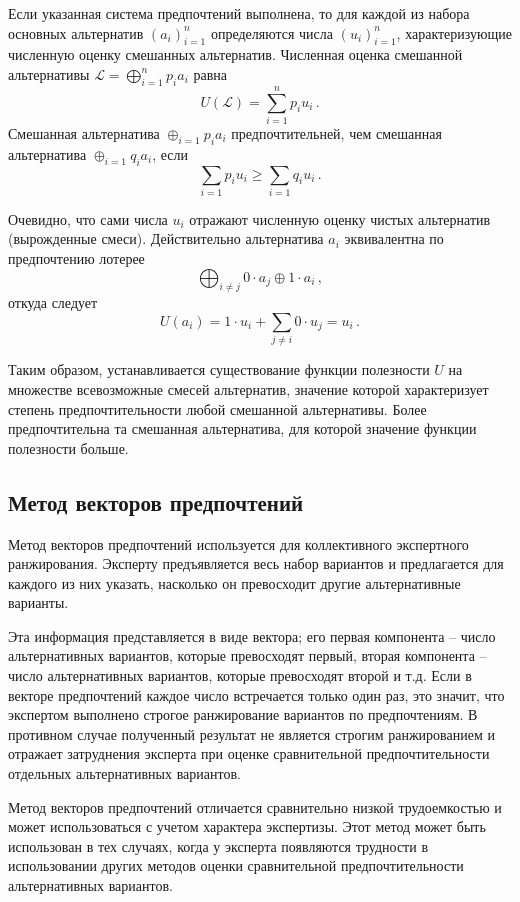 \documentclass[a4paper,12pt]{extreport}
\newcommand{\Lcal}{\mathcal{L}}
\begin{document}
Если указанная система предпочтений выполнена, то для каждой из набора основных
альтернатив $(a_i)_{i=1}^n$ определяются числа $(u_i)_{i=1}^n$, характеризующие
численную оценку смешанных альтернатив. Численная оценка смешанной альтернативы
$\Lcal = \bigoplus_{i=1}^n p_i a_i$ равна
\[ U(\Lcal) = \sum_{i=1}^n p_i u_i\,. \]
Смешанная альтернатива $\oplus_{i=1}p_i a_i$ предпочтительней, чем смешанная альтернатива
$\oplus_{i=1}q_i a_i$, если 
\[ \sum_{i=1} p_i u_i \geq \sum_{i=1} q_i u_i\,. \]

Очевидно, что сами числа $u_i$ отражают численную оценку чистых альтернатив
(вырожденные смеси). Действительно альтернатива $a_i$ эквивалентна по предпочтению
лотерее
\[ \bigoplus_{i\neq j} 0\cdot a_j \oplus 1\cdot a_i\,, \]
откуда следует
\[ U(a_i) = 1 \cdot u_i + \sum_{j\neq i} 0 \cdot u_j = u_i \,. \]

Таким образом, устанавливается существование функции полезности $U$ на множестве
всевозможные смесей альтернатив, значение которой характеризует степень
предпочтительности любой смешанной альтернативы. Более предпочтительна та смешанная
альтернатива, для которой значение функции полезности больше.


\subsection*{Метод векторов предпочтений} %
\label{sub:preference_vectors}

Метод векторов предпочтений используется для коллективного экспертного ранжирования.
Эксперту предъявляется весь набор вариантов и предлагается для каждого из них указать,
насколько он превосходит другие альтернативные варианты.

Эта информация представляется в виде вектора; его первая компонента -- число
альтернативных вариантов, которые превосходят первый, вторая компонента -- число
альтернативных вариантов, которые превосходят второй и т.д. Если в векторе предпочтений
каждое число встречается только один раз, это значит, что экспертом выполнено строгое
ранжирование вариантов по предпочтениям. В противном случае полученный результат
не является строгим ранжированием и отражает затруднения эксперта при оценке сравнительной
предпочтительности отдельных альтернативных вариантов.

Метод векторов предпочтений отличается сравнительно низкой трудоемкостью и может
использоваться с учетом характера экспертизы. Этот метод может быть использован
в тех случаях, когда у эксперта появляются трудности в использовании других методов
оценки сравнительной предпочтительности альтернативных вариантов.
\end{document}
